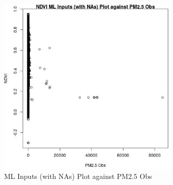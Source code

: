 \begin{figure} 
\centering  
\includegraphics[width=0.77\textwidth]{Code_Outputs/Report_ML_input_PM25_Step4_part_f_de_duplicated_aves_prioritize_24hr_obswNAs_NDVIvPM25_Obs.jpg} 
\caption{\label{fig:Report_ML_input_PM25_Step4_part_f_de_duplicated_aves_prioritize_24hr_obswNAsNDVIvPM25_Obs}ML Inputs (with NAs) Plot against PM2.5 Obs} 
\end{figure} 
 
